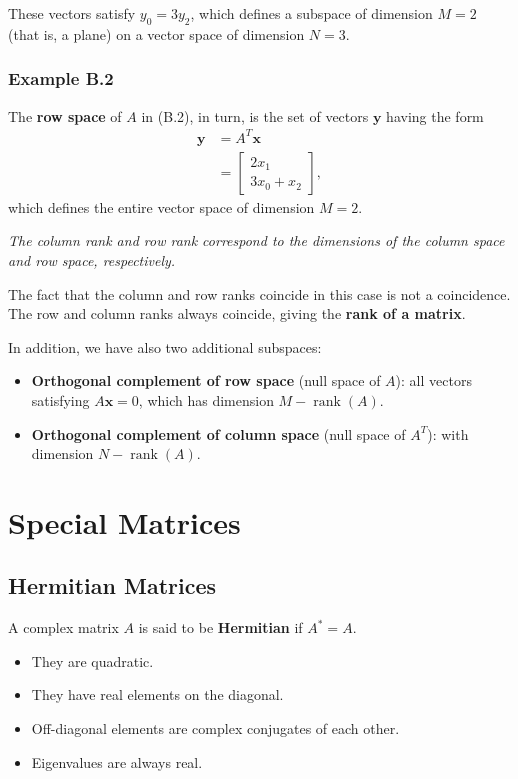 These vectors satisfy $y_0 = 3y_2$, which defines a subspace of dimension $M = 2$ (that is, a plane)  
on a vector space of dimension $N = 3$.

\subsubsection{Example B.2}

The \textbf{row space} of $A$ in (B.2), in turn, is the set of vectors $\mathbf{y}$ having the form
\begin{align}
\mathbf{y} &= A^T \mathbf{x} \tag{B.5} \\[6pt]
&=
\begin{bmatrix}
2x_1 \\
3x_0 + x_2
\end{bmatrix},
\tag{B.6}
\end{align}
which defines the entire vector space of dimension $M = 2$.

\medskip

\textit{The column rank and row rank correspond to the dimensions of the column space and row space, respectively.}

The fact that the column and row ranks coincide in this case is not a coincidence.  
The row and column ranks always coincide, giving the \textbf{rank of a matrix}.

In addition, we have also two additional subspaces:

\begin{itemize}
    \item \textbf{Orthogonal complement of row space} (null space of $A$): all vectors satisfying $A\mathbf{x} = 0$, which has dimension $M - \operatorname{rank}(A)$.
    \item \textbf{Orthogonal complement of column space} (null space of $A^T$): with dimension $N - \operatorname{rank}(A)$.
\end{itemize}

\section{Special Matrices}

\subsection{Hermitian Matrices}

A complex matrix $A$ is said to be \textbf{Hermitian} if $A^* = A$.

\begin{itemize}
    \item They are quadratic.  
    \item They have real elements on the diagonal.  
    \item Off-diagonal elements are complex conjugates of each other.  
    \item Eigenvalues are always real.
\end{itemize}

